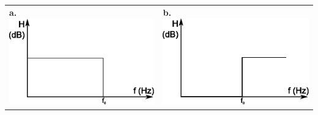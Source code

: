 \begin{table}[h]
\centering
\begin{tabular}{ll}
\textbf{a. }\includegraphics[scale=0.7]{images/lowpass_generic} \newline  & \textbf{b.} \includegraphics[scale=0.7]{images/highpass_generic}  \\

\end{tabular}
\end{table}
